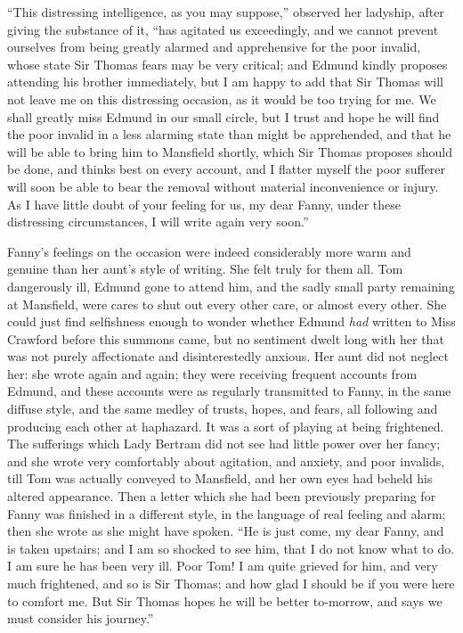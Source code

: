 ``This distressing intelligence, as you may suppose,''
observed her ladyship, after giving the substance of it,
``has agitated us exceedingly, and we cannot prevent
ourselves from being greatly alarmed and apprehensive
for the poor invalid, whose state Sir Thomas fears may
be very critical; and Edmund kindly proposes attending
his brother immediately, but I am happy to add that Sir
Thomas will not leave me on this distressing occasion,
as it would be too trying for me.  We shall greatly miss
Edmund in our small circle, but I trust and hope he
will find the poor invalid in a less alarming state than
might be apprehended, and that he will be able to bring
him to Mansfield shortly, which Sir Thomas proposes
should be done, and thinks best on every account, and I
flatter myself the poor sufferer will soon be able to bear
the removal without material inconvenience or injury.
As I have little doubt of your feeling for us, my dear Fanny,
under these distressing circumstances, I will write again
very soon.''

Fanny's feelings on the occasion were indeed considerably
more warm and genuine than her aunt's style of writing.
She felt truly for them all.  Tom dangerously ill,
Edmund gone to attend him, and the sadly small party
remaining at Mansfield, were cares to shut out every
other care, or almost every other.  She could just find
selfishness enough to wonder whether Edmund \emph{had} written
to Miss Crawford before this summons came, but no sentiment
dwelt long with her that was not purely affectionate and
disinterestedly anxious.  Her aunt did not neglect her:
she wrote again and again; they were receiving frequent
accounts from Edmund, and these accounts were as regularly
transmitted to Fanny, in the same diffuse style,
and the same medley of trusts, hopes, and fears,
all following and producing each other at haphazard.
It was a sort of playing at being frightened.
The sufferings which Lady Bertram did not see had little
power over her fancy; and she wrote very comfortably
about agitation, and anxiety, and poor invalids, till Tom
was actually conveyed to Mansfield, and her own eyes had
beheld his altered appearance.  Then a letter which she
had been previously preparing for Fanny was finished
in a different style, in the language of real feeling
and alarm; then she wrote as she might have spoken.
``He is just come, my dear Fanny, and is taken upstairs;
and I am so shocked to see him, that I do not know
what to do.  I am sure he has been very ill.  Poor Tom!
I am quite grieved for him, and very much frightened,
and so is Sir Thomas; and how glad I should be if you
were here to comfort me.  But Sir Thomas hopes he
will be better to-morrow, and says we must consider
his journey.''

